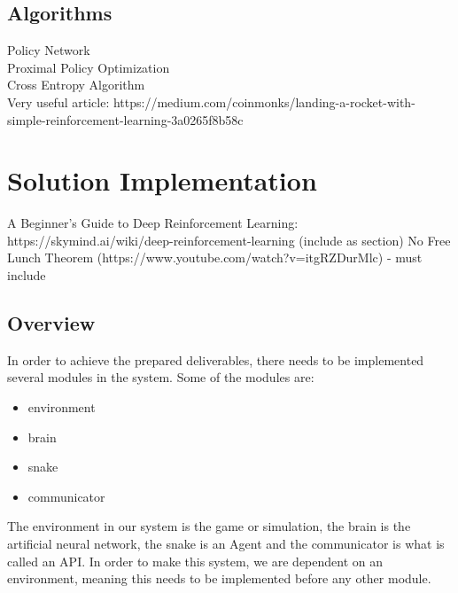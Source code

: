 \documentclass[
a4paper,
11pt,
english
]{report}
\newenvironment{myitemize}{
    \begin{itemize}
    \setlength{\itemsep}{0pt}
    \setlength{\parskip}{0pt}
    \setlength{\parsep}{0pt}
}{\end{itemize}}
\begin{document}
\section{Algorithms}
Policy Network\\
Proximal Policy Optimization\\
Cross Entropy Algorithm\\
Very useful article: https://medium.com/coinmonks/landing-a-rocket-with-simple-reinforcement-learning-3a0265f8b58c



\chapter{Solution Implementation}

A Beginner's Guide to Deep Reinforcement Learning: https://skymind.ai/wiki/deep-reinforcement-learning
(include as section) No Free Lunch Theorem (https://www.youtube.com/watch?v=itgRZDurMlc) - must include

\section{Overview}
In order to achieve the prepared deliverables, there needs to be implemented several modules in the system. Some of the modules are:

\begin{myitemize}
    \item environment
    \item brain
    \item snake
    \item communicator
\end{myitemize}

The environment in our system is the game or simulation, the brain is the artificial neural network, the snake is an Agent and the communicator is what is called an API. In order to make this system, we are dependent on an environment, meaning this needs to be implemented before any other module.
\end{document}
